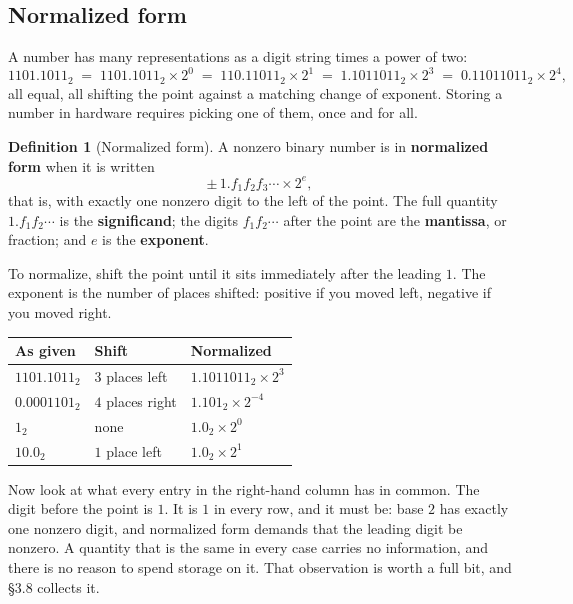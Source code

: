 \documentclass[11pt]{article}
\theoremstyle{plain}
\theoremstyle{definition}
\newtheorem{defn}{Definition}[section]
\theoremstyle{remark}
\begin{document}
\subsection{Normalized form}
A number has many representations as a digit string times a power of two:
\[
  1101.1011_{2}
  \;=\; 1101.1011_{2}\times2^{0}
  \;=\; 110.11011_{2}\times2^{1}
  \;=\; 1.1011011_{2}\times2^{3}
  \;=\; 0.11011011_{2}\times2^{4},
\]
all equal, all shifting the point against a matching change of exponent. Storing
a number in hardware requires picking one of them, once and for all.

\begin{defn}[Normalized form]
A nonzero binary number is in \textbf{normalized form} when it is written
\[
  \pm\, 1.f_1f_2f_3\cdots \times 2^{e},
\]
that is, with exactly one nonzero digit to the left of the point. The full
quantity $1.f_1f_2\cdots$ is the \textbf{significand}; the digits
$f_1f_2\cdots$ after the point are the \textbf{mantissa}, or fraction; and $e$
is the \textbf{exponent}.
\end{defn}

\noindent To normalize, shift the point until it sits immediately after the
leading $1$. The exponent is the number of places shifted: positive if you moved
left, negative if you moved right.

\begin{center}
\renewcommand{\arraystretch}{1.35}
\begin{tabular}{@{}l l l@{}}
\toprule
\textbf{As given} & \textbf{Shift} & \textbf{Normalized} \\
\midrule
$1101.1011_{2}$ & $3$ places left  & $1.1011011_{2}\times2^{3}$ \\
$0.0001101_{2}$ & $4$ places right & $1.101_{2}\times2^{-4}$ \\
$1_{2}$         & none             & $1.0_{2}\times2^{0}$ \\
$10.0_{2}$      & $1$ place left   & $1.0_{2}\times2^{1}$ \\
\bottomrule
\end{tabular}
\end{center}

\noindent Now look at what every entry in the right-hand column has in common.
The digit before the point is $1$. It is $1$ in every row, and it must be: base
$2$ has exactly one nonzero digit, and normalized form demands that the leading
digit be nonzero. A quantity that is the same in every case carries no
information, and there is no reason to spend storage on it. That observation is
worth a full bit, and \S3.8 collects it.
\end{document}
